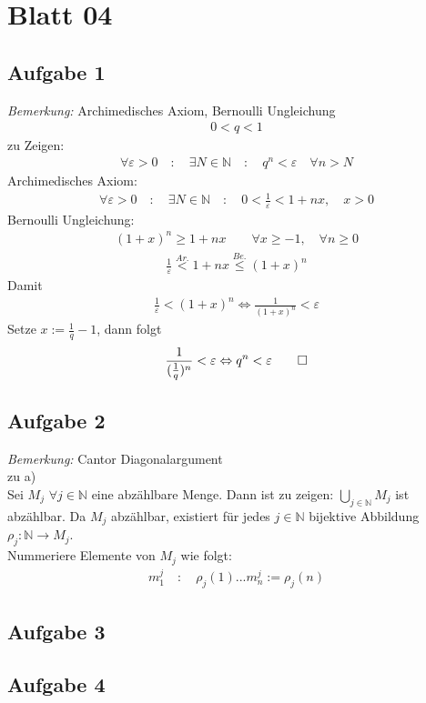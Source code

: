 \chapter{Blatt 04}
\section{Aufgabe 1}
\textit{Bemerkung:} Archimedisches Axiom, Bernoulli Ungleichung\\
\begin{align*}
  0<q<1
\end{align*}
zu Zeigen:
\begin{align*}
  \forall \varepsilon >0\quad :\quad\exists N\in\mathbb{N}\quad :\quad q^n<\varepsilon \quad\forall n>N
\end{align*}
Archimedisches Axiom:
\begin{align*}
  \forall \varepsilon >0\quad :\quad\exists N\in\mathbb{N}\quad :\quad0<\frac{1}{\varepsilon}<1+nx,\quad x > 0
\end{align*}
Bernoulli Ungleichung:
\begin{align*}
  (1+x)^n\geq 1+nx \qquad\forall x\geq-1,\quad\forall n\geq0
\end{align*}
\begin{align*}
  \frac{1}{\varepsilon}\overset{Ar.}{<}1+nx\overset{Be.}{\leq}(1+x)^n
\end{align*}
Damit
\begin{align*}
  \frac{1}{\varepsilon}<(1+x)^n \Leftrightarrow \frac{1}{(1+x)^n}<\varepsilon
\end{align*}
Setze $x:= \frac{1}{q}-1$, dann folgt
\begin{align*}
  \frac{1}{(\frac{1}{q})^n}<\varepsilon \Leftrightarrow q^n<\varepsilon\qed
\end{align*}
\section{Aufgabe 2}
\textit{Bemerkung:} Cantor Diagonalargument\\
zu a)\\
Sei $M_j$ $\forall j \in \mathbb{N}$ eine abzählbare Menge. Dann ist zu zeigen: $\bigcup\limits_{j \in \mathbb{N}}M_j$ ist abzählbar. Da $M_j$ abzählbar, existiert für jedes $j\in\mathbb{N}$ bijektive Abbildung $\rho_j:\mathbb{N}\rightarrow M_j$.\\
Nummeriere Elemente von $M_j$ wie folgt:
\begin{align*}
  m_{1}^{j}\quad : \quad \rho_{j}(1) ... m_{n}^{j}:= \rho_{j}(n)
\end{align*}
\section{Aufgabe 3}
\section{Aufgabe 4}

